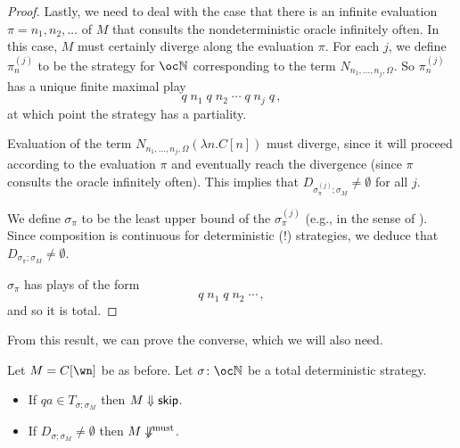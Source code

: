 \documentclass[sigplan,9pt,review]{acmart}\settopmatter{printfolios=true,printccs=false,printacmref=false}
\begin{document}
\begin{proof}
  Lastly, we need to deal with the case that there is an infinite evaluation $\pi = n_1,n_2,\dots$ of $M$ that consults the nondeterministic oracle infinitely often.
  In this case, $M$ must certainly diverge along the evaluation $\pi$.
  For each $j$, we define $\pi_n^{(j)}$ to be the strategy for $\oc \bN$ corresponding to the term $N_{n_1,\dots,n_j,\Omega}$.  
  So $\pi_n^{(j)}$ has a unique finite maximal play
  \[
    q\;n_1\;q\;n_2\;\cdots\;q\;n_j\;q\,,
    \]
  at which point the strategy has a partiality.  

  Evaluation of the term $N_{n_1,\dots,n_j,\Omega} (\lambda n.C[n])$ must diverge, since it will proceed according to the evaluation $\pi$ and eventually reach the divergence (since $\pi$ consults the oracle infinitely often).  
  This implies that $D_{\sigma_\pi^{(j)};\sigma_M}\ne\emptyset$ for all $j$.

  We define $\sigma_\pi$ to be the least upper bound of the $\sigma_\pi^{(j)}$ (e.g., in the sense of \cite{mcCHFiniteND}).  
  Since composition is continuous for deterministic (!) strategies, we deduce that $D_{\sigma_\pi;\sigma_M}\ne\emptyset$.

  $\sigma_\pi$ has plays of the form
  \[
    q\;n_1\;q\;n_2\;\cdots\,,
    \]
  and so it is total.
\end{proof}

From this result, we can prove the converse, which we will also need.

\begin{lemma}
  Let $M=C[\wn]$ be as before.
  Let $\sigma\from\oc\bN$ be a total deterministic strategy.
  \begin{itemize}
    \item If $qa\in T_{\sigma;\sigma_M}$ then $M\Downarrow{\mathsf{skip}}$.
    \item If $D_{\sigma;\sigma_M}\ne\emptyset$ then $M\not\Downarrow^{\text{must}}$.
  \end{itemize}
  \label{lem:soundness-converse}
\end{lemma}
\end{document}

